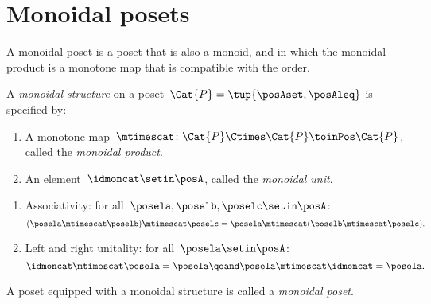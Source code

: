 
\section{Monoidal posets}
\label{sec:monoidal-posets}

A monoidal poset is a poset that is also a monoid, and in which the monoidal product is a monotone map that is compatible with the order.


\begin{ctdefinition}
    \label{def:monoidal-poset}
    A \emph{monoidal structure} on a poset~$\Cat{P} = \tup{\posAset, \posAleq}$ is specified by:

    \constit
    \begin{enumerate}
        \item A monotone map~$\mtimescat \colon \Cat{P} \Ctimes \Cat{P} \toinPos \Cat{P}$, called the \emph{monoidal product}.
        \item An element~$\idmoncat \setin \posA$, called the \emph{monoidal unit}.
    \end{enumerate}

    \condit
    \begin{enumerate}
        \item Associativity: for all~$\posela, \poselb, \poselc \setin \posA$:
              \begin{equation}
                  (\posela \mtimescat \poselb)
                  \mtimescat \poselc =  \posela  \mtimescat ( \poselb \mtimescat \poselc).
              \end{equation}
        \item Left and right unitality: for all~$\posela \setin \posA$:
              \begin{equation}
                  \idmoncat \mtimescat \posela = \posela
                  \qqand
                  \posela \mtimescat \idmoncat = \posela.
              \end{equation}
    \end{enumerate}

    \noindent A poset equipped with a monoidal structure is called a \emph{monoidal poset}.
\end{ctdefinition}

